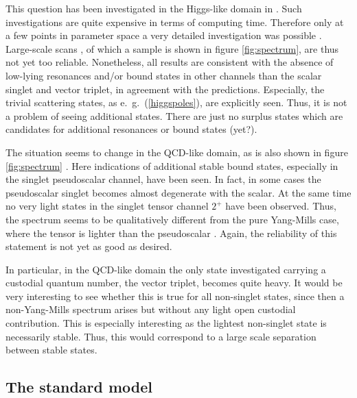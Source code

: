 \documentclass[final,twoside,12pt]{article}
\newcommand*{\pref}[1]{(\ref{#1})}
\newcommand*{\1}{1\!\!\!\bot}
\begin{document}
This question has been investigated in the Higgs-like domain in \cite{Maas:2014pba,Wurtz:2013ova}. Such investigations are quite expensive in terms of computing time. Therefore only at a few points in parameter space a very detailed investigation was possible \cite{Wurtz:2013ova}. Large-scale scans \cite{Maas:2014pba}, of which a sample is shown in figure \ref{fig:spectrum}, are thus not yet too reliable. Nonetheless, all results are consistent with the absence of low-lying resonances and/or bound states in other channels than the scalar singlet and vector triplet, in agreement with the predictions. Especially, the trivial scattering states, as e.\ g.\ \pref{higgspoles}, are explicitly seen. Thus, it is not a problem of seeing additional states. There are just no surplus states which are candidates for additional resonances or bound states (yet?).

The situation seems to change in the QCD-like domain, as is also shown in figure \ref{fig:spectrum} \cite{Maas:2014pba}. Here indications of additional stable bound states, especially in the singlet pseudoscalar channel, have been seen. In fact, in some cases the pseudoscalar singlet becomes almost degenerate with the scalar. At the same time no very light states in the singlet tensor channel $2^+$ have been observed. Thus, the spectrum seems to be qualitatively different from the pure Yang-Mills case, where the tensor is lighter than the pseudoscalar \cite{Mathieu:2008me}. Again, the reliability of this statement is not yet as good as desired.

In particular, in the QCD-like domain the only state investigated carrying a custodial quantum number, the vector triplet, becomes quite heavy. It would be very interesting to see whether this is true for all non-singlet states, since then a non-Yang-Mills spectrum arises but without any light open custodial contribution. This is especially interesting as the lightest non-singlet state is necessarily stable. Thus, this would correspond to a large scale separation between stable states.

\subsection{The standard model}\label{ss:sm}
\end{document}
